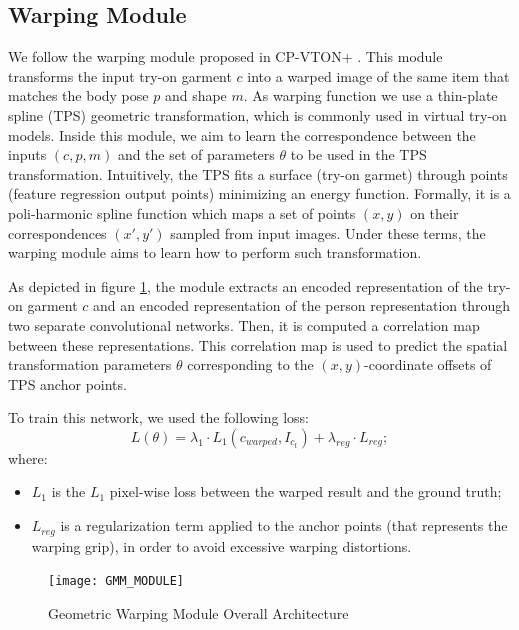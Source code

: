 \subsection{Warping Module}
We follow the warping module proposed in CP-VTON+ \cite{CP-VTON+}.
This module transforms the input try-on garment $c$ into a warped image of the same item that matches the body pose $p$ and shape $m$. As warping function we use a thin-plate spline (TPS) geometric transformation, which is commonly used in virtual try-on models.  Inside this module, we aim to learn the correspondence between the inputs $(c, p, m)$ and the set of parameters $\theta$ to be used in the TPS transformation. Intuitively, the TPS fits a surface (try-on garmet) through points (feature regression output points) minimizing an energy function. Formally, it is a poli-harmonic spline function which maps a set of points $(x,y)$ on their correspondences $(x',y')$ sampled from input images. Under these terms, the warping module aims to learn how to perform such transformation.

As depicted in figure \ref{fig:GMM_MODULE}, the module extracts an encoded representation of the try-on garment $c$ and an encoded representation of the person representation through two separate convolutional networks.
Then, it is computed a correlation map between these representations.
This correlation map is used to predict the spatial transformation parameters $\theta$ corresponding to the $(x,y)$-coordinate offsets of TPS anchor points. 

To train this network, we used the following loss:
\begin{equation}
L(\theta) = \lambda_1 \cdot L_1(c_{warped}, I_{c_t}) + \lambda_{reg} \cdot L_{reg} ;
\end{equation} 
where:
\begin{itemize}[noitemsep]
	\item{$L_1$ is the $L_1$ pixel-wise loss between the warped result and the ground truth;} 
	\item{$L_{reg}$ is a regularization term applied to the anchor points (that represents the warping grip), in order to avoid excessive warping distortions.}
\end{itemize}
 

\begin{figure}[h]
\centering
\texttt{[image: GMM\_MODULE]}
\caption{Geometric Warping Module Overall Architecture}
\label{fig:GMM_MODULE}
\end{figure}



